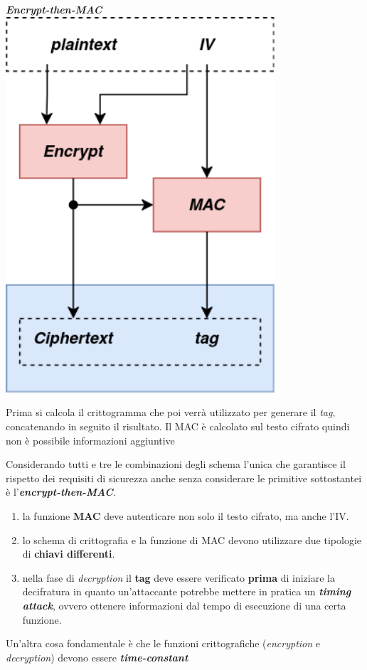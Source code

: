 \begin{flushleft}
{\begin{minipage}[c]{0.30\textwidth}
        \end{minipage}
        \begin{minipage}[c]{0.30\textwidth}
            \centering
            \textbf{\textit{Encrypt-then-MAC}} \\
            \includegraphics[width=0.75\textwidth]{img/enc_then_mac.png}

            Prima si calcola il crittogramma che poi verrà utilizzato per generare il \textit{tag}, concatenando in seguito il risultato. Il MAC è calcolato sul testo cifrato quindi non è possibile informazioni aggiuntive

        \end{minipage}
    \par}

    Considerando tutti e tre le combinazioni degli schema l'unica che garantisce il rispetto dei requisiti di sicurezza anche senza considerare le primitive sottostantei è l'\textbf{\textit{encrypt-then-MAC}}.
    \begin{enumerate}[nosep]
        \item la funzione \textbf{MAC} deve autenticare non solo il testo cifrato, ma anche l'IV.
        \item lo schema di crittografia e la funzione di MAC devono utilizzare due tipologie di \textbf{chiavi differenti}.
        \item nella fase di \textit{decryption} il \textbf{tag} deve essere verificato \textbf{prima} di iniziare la decifratura in quanto un'attaccante potrebbe mettere in pratica un \textbf{\textit{timing attack}}, ovvero ottenere informazioni dal tempo di esecuzione di una certa funzione.
    \end{enumerate}
    Un'altra cosa fondamentale è che le funzioni crittografiche (\textit{encryption} e \textit{decryption}) devono essere \textbf{\textit{time-constant}}
\end{flushleft}

